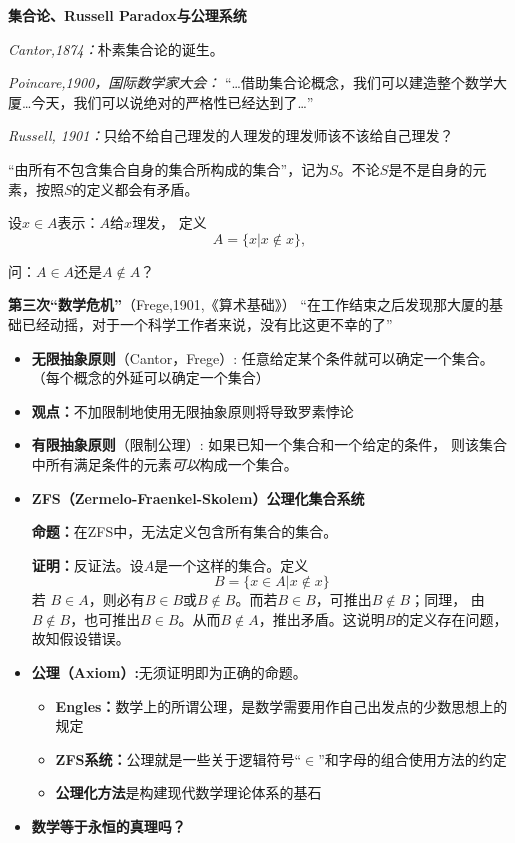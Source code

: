 \begin{shaded}

{\bf 集合论、Russell Paradox与公理系统}

	{\it Cantor,1874：}朴素集合论的诞生。	

	{\it Poincare,1900，国际数学家大会：} 
		 {“\ldots 借助集合论概念，我们可以建造整个数学大厦\ldots  今天，我们可以说绝对的严格性已经达到了\ldots”}
	
	{\it Russell, 1901：}只给不给自己理发的人理发的理发师该不该给自己理发？
	
	“由所有不包含集合自身的集合所构成的集合”，记为$S$。不论$S$是不是自身的元素，按照$S$的定义都会有矛盾。
	
	设$x\in A$表示：$A$给$x$理发， 定义
	$$A=\{x|x\notin x\},$$ 
	
	问：$A\in A$还是$A\notin A$？ 
	
	{{\bf {第三次“数学危机”}}（Frege,1901,《算术基础》）}
		“在工作结束之后发现那大厦的基础已经动摇，对于一个科学工作者来说，没有比这更不幸的了”
		
	\begin{itemize}
	  \item {{\bf 无限抽象原则}（Cantor，Frege）:} 任意给定某个条件就可以确定一个集合。（每个概念的外延可以确定一个集合）
	  \item {\bf 观点：}不加限制地使用无限抽象原则将导致罗素悖论
	  \item {{\bf 有限抽象原则}（限制公理）:} 如果已知一个集合和一个给定的条件，
	  则该集合中所有满足条件的元素{\it 可以}构成一个集合。
	  \item {\bf ZFS（Zermelo-Fraenkel-Skolem）公理化集合系统}
	  
	  {\bf 命题：}在ZFS中，无法定义包含所有集合的集合。
	
	{\bf 证明：}反证法。设$A$是一个这样的集合。定义
	$$B=\{x\in A|x\notin x\}$$
	若
	$B\in A$，则必有$B\in B$或$B\notin B$。而若$B\in B$，可推出$B\notin B$；同理，
	由$B\notin B$，也可推出$B\in B$。从而$B\notin A$，推出矛盾。这说明$B$的定义存在问题，故知假设错误。

	\item {\bf 公理（Axiom）:}无须证明即为正确的命题。
	\begin{itemize}
	  \item {\bf Engles：}数学上的所谓公理，是数学需要用作自己出发点的少数思想上的规定 
	  \item {\bf ZFS系统：}公理就是一些关于逻辑符号{“$\in$”}和{字母}的组合使用方法的约定
	  \item {\bf 公理化方法}是构建现代数学理论体系的基石
	\end{itemize}
	\item {\bf {数学等于永恒的真理吗？}}
	\end{itemize}
\end{shaded}
	
